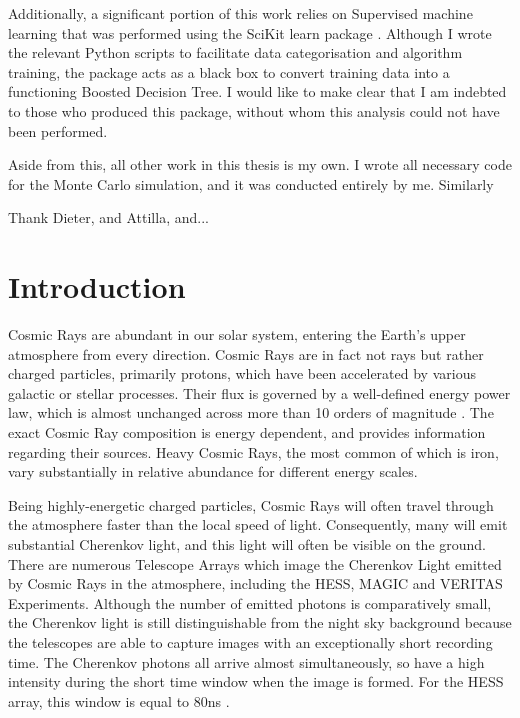 \documentclass[11pt]{article}
\begin{document}
Additionally, a significant portion of this work relies on Supervised machine learning that was performed using the SciKit learn package \cite{scikit-learn}. Although I wrote the relevant Python scripts to facilitate data categorisation and algorithm training, the package acts as a black box to convert training data into a functioning Boosted Decision Tree. I would like to make clear that I am indebted to those who produced this package, without whom this analysis could not have been performed.

Aside from this, all other work in this thesis is my own. I wrote all necessary code for the Monte Carlo simulation, and it was conducted entirely by me. Similarly 

Thank Dieter, and Attilla, and...
\newpage

\section{Introduction}
Cosmic Rays are abundant in our solar system, entering the Earth's upper atmosphere from every direction. Cosmic Rays are in fact not rays but rather charged particles, primarily protons, which have been accelerated by various galactic or stellar processes. Their flux is governed by a well-defined energy power law, which is almost unchanged across more than 10 orders of magnitude \cite{Blasi:2013rva}.  The exact Cosmic Ray composition is energy dependent, and provides information regarding their sources. Heavy Cosmic Rays, the most common of which is iron, vary substantially in relative abundance for different energy scales.

Being highly-energetic charged particles, Cosmic Rays will often travel through the atmosphere faster than the local speed of light. Consequently, many will emit substantial Cherenkov light, and this light will often be visible on the ground. There are numerous Telescope Arrays which image the Cherenkov Light emitted by Cosmic Rays in the atmosphere, including the HESS, MAGIC and VERITAS Experiments. Although the number of emitted photons is comparatively small, the Cherenkov light is still distinguishable from the night sky background because the telescopes are able to capture images with an exceptionally short recording time. The Cherenkov photons all arrive almost simultaneously, so have a high intensity during the short time window when the image is formed. For the HESS array, this window is equal to 80ns \cite{Funk:2004ie}.
\end{document}
